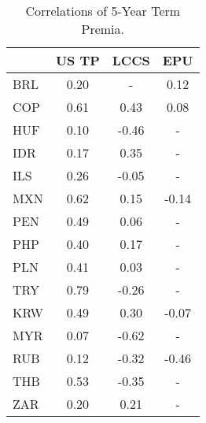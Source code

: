 \begin{tiny}\begin{table}\centering\begin{tabular}{l|ccc}\toprule & US TP & LCCS & EPU \\\midrule BRL & 0.20 & - & 0.12 \\COP & 0.61 & 0.43 & 0.08 \\HUF & 0.10 & -0.46 & - \\IDR & 0.17 & 0.35 & - \\ILS & 0.26 & -0.05 & - \\MXN & 0.62 & 0.15 & -0.14 \\PEN & 0.49 & 0.06 & - \\PHP & 0.40 & 0.17 & - \\PLN & 0.41 & 0.03 & - \\TRY & 0.79 & -0.26 & - \\KRW & 0.49 & 0.30 & -0.07 \\MYR & 0.07 & -0.62 & - \\RUB & 0.12 & -0.32 & -0.46 \\THB & 0.53 & -0.35 & - \\ZAR & 0.20 & 0.21 & - \\\bottomrule\end{tabular}\caption{Correlations of 5-Year Term Premia.}\label{table:Correls5yr}\end{table}\end{tiny}